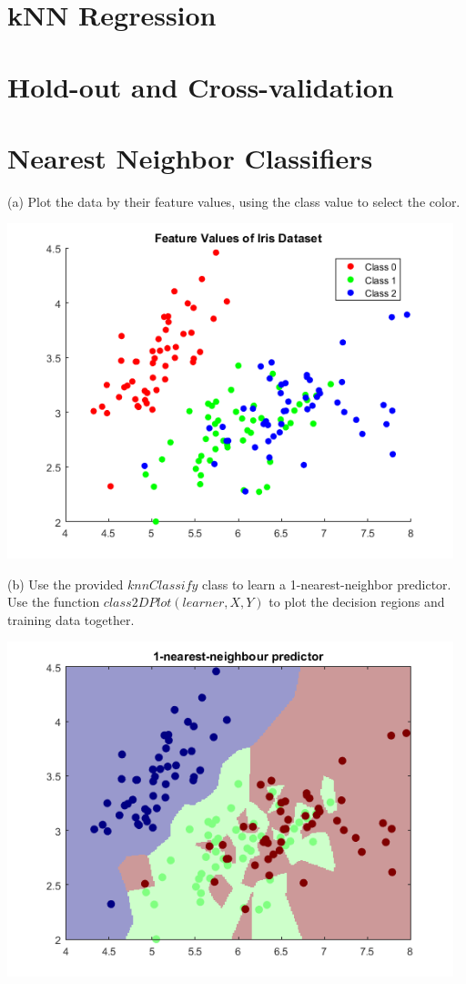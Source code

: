\documentclass[]{report}   %
\begin{document}
\section{kNN Regression}
\section{Hold-out and Cross-validation}
\section{Nearest Neighbor Classifiers}

(a) Plot the data by their feature values, using the class value to select the color.
\begin{center}
	\includegraphics[width=35em]{2_4_Figure_1.png}
\end{center} 
(b) Use the provided $knnClassify$ class to learn a 1-nearest-neighbor predictor. Use the function $class2DPlot(learner,X,Y)$ to plot the decision regions and training data together.
\begin{center}
	\includegraphics[width=35em]{2_4_Figure_2.png}
\end{center} 
\end{document}
